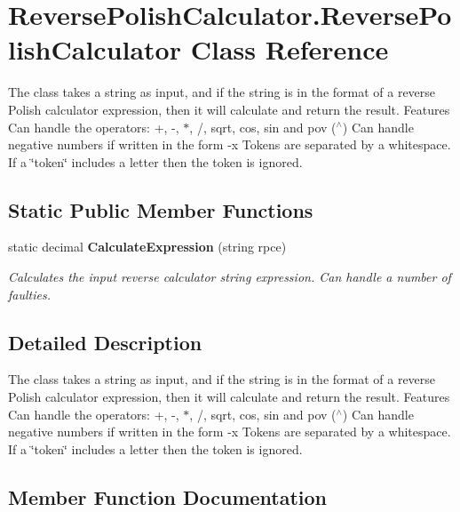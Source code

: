 \section{Reverse\+Polish\+Calculator.\+Reverse\+Polish\+Calculator Class Reference}
\label{class_reverse_polish_calculator_1_1_reverse_polish_calculator}


The class takes a string as input, and if the string is in the format of a reverse Polish calculator expression, then it will calculate and return the result. Features Can handle the operators\+: +, -\/, $\ast$, /, sqrt, cos, sin and pov ($^\wedge$) Can handle negative numbers if written in the form -\/x Tokens are separated by a whitespace. If a \char`\"{}token\char`\"{} includes a letter then the token is ignored.  


\subsection*{Static Public Member Functions}
\begin{DoxyCompactItemize}
\item 
static decimal {\bf Calculate\+Expression} (string rpce)
\begin{DoxyCompactList}\small\item\em Calculates the input reverse calculator string expression. Can handle a number of faulties. \end{DoxyCompactList}\end{DoxyCompactItemize}


\subsection{Detailed Description}
The class takes a string as input, and if the string is in the format of a reverse Polish calculator expression, then it will calculate and return the result. Features Can handle the operators\+: +, -\/, $\ast$, /, sqrt, cos, sin and pov ($^\wedge$) Can handle negative numbers if written in the form -\/x Tokens are separated by a whitespace. If a \char`\"{}token\char`\"{} includes a letter then the token is ignored. 



\subsection{Member Function Documentation}
